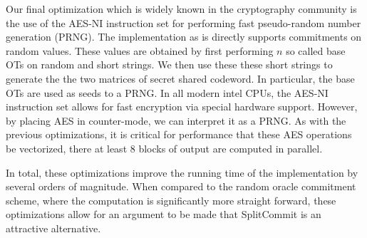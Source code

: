Our final optimization which is widely known in the cryptography community is the use of the AES-NI instruction set for performing fast pseudo-random number generation (PRNG). The implementation as is directly supports commitments on random values. These values are obtained by first performing $n$ so called base OTs on random and short strings. We then use these these short strings to generate the the two matrices of secret shared codeword. In particular, the base OTs are used as seeds to a PRNG. In all modern intel CPUs, the AES-NI instruction set allows for fast encryption via special hardware support. However, by placing AES in counter-mode, we can interpret it as a PRNG. As with the previous optimizations, it is critical for performance that these AES operations be vectorized, there at least 8 blocks of output are computed in parallel.

In total, these optimizations improve the running time of the implementation by several orders of magnitude. When compared to the random oracle commitment scheme, where the computation is significantly more straight forward, these optimizations allow for an argument to be made that SplitCommit is an attractive alternative.